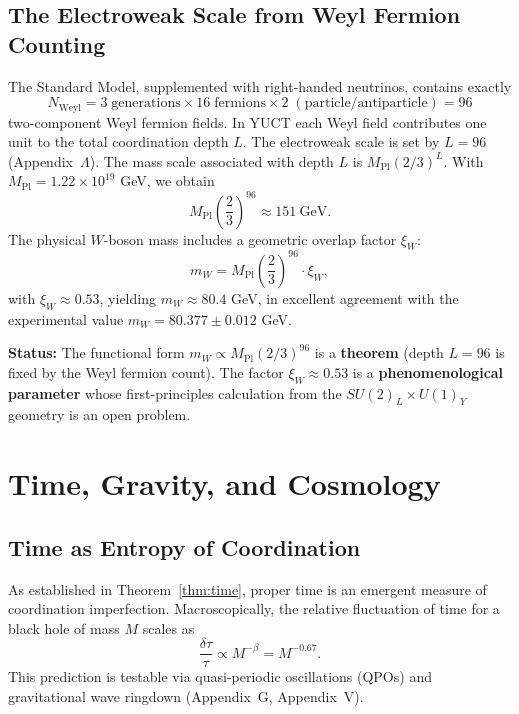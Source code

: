 \documentclass[12pt,a4paper]{article}
\begin{document}
	\subsection{The Electroweak Scale from Weyl Fermion Counting}
	
	The Standard Model, supplemented with right-handed neutrinos, contains exactly
	\begin{equation}
		N_{\mathrm{Weyl}} = 3\;\text{generations} \times 16\;\text{fermions} \times 2\;(\text{particle/antiparticle}) = 96
	\end{equation}
	two-component Weyl fermion fields. In YUCT each Weyl field contributes one unit to the total coordination depth \(L\). The electroweak scale is set by \(L = 96\) (Appendix~\(\Lambda\)). The mass scale associated with depth \(L\) is \(M_{\mathrm{Pl}} (2/3)^{L}\). With \(M_{\mathrm{Pl}} = 1.22 \times 10^{19}\) GeV, we obtain
	\begin{equation}
		M_{\mathrm{Pl}} \left(\frac{2}{3}\right)^{96} \approx 151\ \mathrm{GeV}.
	\end{equation}
	The physical \(W\)-boson mass includes a geometric overlap factor \(\xi_W\):
	\begin{equation}
		m_W = M_{\mathrm{Pl}} \left(\frac{2}{3}\right)^{96} \cdot \xi_W,
		\label{eq:mw}
	\end{equation}
	with \(\xi_W \approx 0.53\), yielding \(m_W \approx 80.4\) GeV, in excellent agreement with the experimental value \(m_W = 80.377 \pm 0.012\) GeV.
	
	\textbf{Status:} The functional form \(m_W \propto M_{\mathrm{Pl}} (2/3)^{96}\) is a \textbf{theorem} (depth \(L=96\) is fixed by the Weyl fermion count). The factor \(\xi_W \approx 0.53\) is a \textbf{phenomenological parameter} whose first-principles calculation from the \(SU(2)_L \times U(1)_Y\) geometry is an open problem.
	
	\section{Time, Gravity, and Cosmology}
	\label{sec:cosmology}
	
	\subsection{Time as Entropy of Coordination}
	
	As established in Theorem~\ref{thm:time}, proper time is an emergent measure of coordination imperfection. Macroscopically, the relative fluctuation of time for a black hole of mass \(M\) scales as
	\begin{equation}
		\boxed{\frac{\delta \tau}{\tau} \propto M^{-\beta} = M^{-0.67}}.
	\end{equation}
	This prediction is testable via quasi-periodic oscillations (QPOs) and gravitational wave ringdown (Appendix~G, Appendix~V).
	
\end{document}
